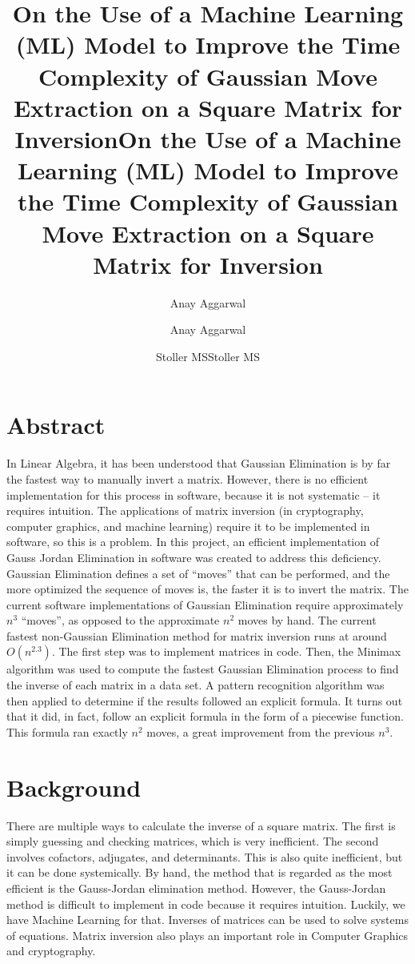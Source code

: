 \documentclass{article}
\title{On the Use of a Machine Learning (ML) Model to Improve the Time Complexity of Gaussian Move Extraction on a Square Matrix for Inversion}
\author{Anay Aggarwal}
\date{Stoller MS}
\title{{\large On the Use of a Machine Learning (ML) Model to Improve the Time Complexity of Gaussian Move Extraction on a Square Matrix for Inversion}}
\author{Anay Aggarwal}
\date{Stoller MS}
\begin{document}
\maketitle
\thispagestyle{firstpage}
\newpage
\thispagestyle{fancy}
\section*{Abstract}
In Linear Algebra, it has been understood that Gaussian Elimination is by far the fastest way to manually invert a matrix. However, there is no efficient implementation for this process in software, because it is not systematic -- it requires intuition. The applications of matrix inversion (in cryptography, computer graphics, and machine learning) require it to be implemented in software, so this is a problem. In this project, an efficient implementation of Gauss Jordan Elimination in software was created to address this deficiency. Gaussian Elimination defines a set of “moves” that can be performed, and the more optimized the sequence of moves is, the faster it is to invert the matrix. The current software implementations of Gaussian Elimination require approximately $n^3$ “moves”, as opposed to the approximate $n^2$ moves by hand. The current fastest non-Gaussian Elimination method for matrix inversion runs at around $O(n^{2.3})$. The first step was to implement matrices in code. Then, the Minimax algorithm was used to compute the fastest Gaussian Elimination process to find the inverse of each matrix in a data set. A pattern recognition algorithm was then applied to determine if the results followed an explicit formula. It turns out that it did, in fact, follow an explicit formula in the form of a piecewise function. This formula ran exactly $n^2$ moves, a great improvement from the previous $n^3$.
\newpage
\section*{Background}
There are multiple ways to calculate the inverse of a square matrix. The first is simply guessing and checking matrices, which is very inefficient. The second involves cofactors, adjugates, and determinants. This is also quite inefficient, but it can be done systemically. By hand, the method that is regarded as the most efficient is the Gauss-Jordan elimination method. However, the Gauss-Jordan method is difficult to implement in code because it requires intuition. Luckily, we have Machine Learning for that. Inverses of matrices can be used to solve systems of equations.  Matrix inversion also plays an important role in Computer Graphics and cryptography.
\end{document}
